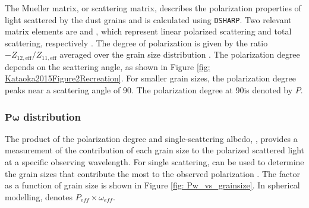 The Mueller matrix, or scattering matrix, describes the polarization properties of light scattered by the dust grains \citep{Kataoka_2015} and is calculated using \texttt{DSHARP}. Two relevant matrix elements are \Zoo and \ZootNS, which represent linear polarized scattering and total scattering, respectively \citep{Zhang2023}. The degree of polarization is given by the ratio $-Z_{12, \text{eff}}/Z_{11, \text{eff}}$ averaged over the grain size distribution \citep{Kataoka_2015}.  The polarization degree depends on the scattering angle, as shown in Figure \ref{fig: Kataoka2015Figure2Recreation}. For smaller grain sizes, the polarization degree peaks near a scattering angle of  90\deggNS. The polarization degree at  90\degg is denoted by $P$. 








\subsubsection{$\mathbf{P\omega}$ distribution} 

The product of the polarization degree and single-scattering albedo, \PwNS, provides a measurement of the contribution of each grain size to the polarized scattered light at a specific observing wavelength. For single scattering, \Pweff can be used to determine the grain sizes that contribute the most to the observed polarization \citep{Kataoka_2015}. The \Pweff factor as a function of grain size is shown in Figure \ref{fig: Pw_vs_grainsize}. In spherical modelling,  \Pw denotes $P_{eff} \times \omega_{eff}$. 







%
%
%
%
%

%
%
%
%
%

